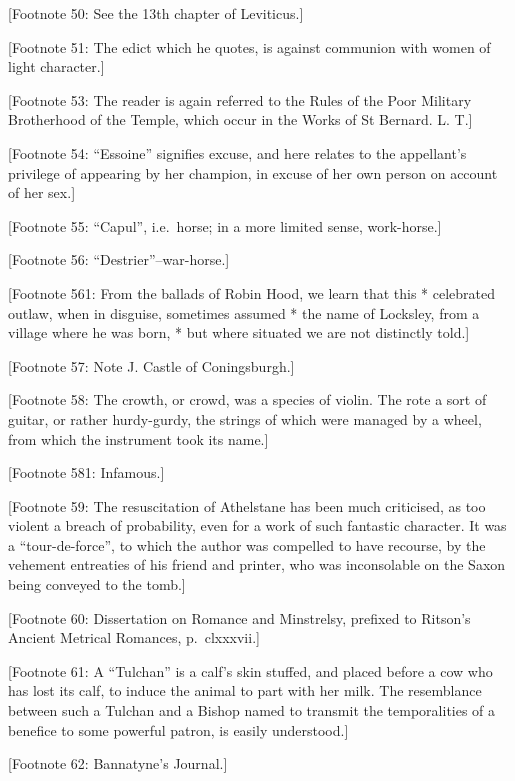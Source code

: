 {[}Footnote 50: See the 13th chapter of Leviticus.{]}

{[}Footnote 51: The edict which he quotes, is against communion with
women of light character.{]}

{[}Footnote 53: The reader is again referred to the Rules of the Poor
Military Brotherhood of the Temple, which occur in the Works of St
Bernard. L. T.{]}

{[}Footnote 54: ``Essoine'' signifies excuse, and here relates to the
appellant's privilege of appearing by her champion, in excuse of her own
person on account of her sex.{]}

{[}Footnote 55: ``Capul'', i.e.~horse; in a more limited sense,
work-horse.{]}

{[}Footnote 56: ``Destrier''--war-horse.{]}

{[}Footnote 561: From the ballads of Robin Hood, we learn that this *
celebrated outlaw, when in disguise, sometimes assumed * the name of
Locksley, from a village where he was born, * but where situated we are
not distinctly told.{]}

{[}Footnote 57: Note J. Castle of Coningsburgh.{]}

{[}Footnote 58: The crowth, or crowd, was a species of violin. The rote
a sort of guitar, or rather hurdy-gurdy, the strings of which were
managed by a wheel, from which the instrument took its name.{]}

{[}Footnote 581: Infamous.{]}

{[}Footnote 59: The resuscitation of Athelstane has been much
criticised, as too violent a breach of probability, even for a work of
such fantastic character. It was a ``tour-de-force'', to which the
author was compelled to have recourse, by the vehement entreaties of his
friend and printer, who was inconsolable on the Saxon being conveyed to
the tomb.{]}

{[}Footnote 60: Dissertation on Romance and Minstrelsy, prefixed to
Ritson's Ancient Metrical Romances, p.~clxxxvii.{]}

{[}Footnote 61: A ``Tulchan'' is a calf's skin stuffed, and placed
before a cow who has lost its calf, to induce the animal to part with
her milk. The resemblance between such a Tulchan and a Bishop named to
transmit the temporalities of a benefice to some powerful patron, is
easily understood.{]}

{[}Footnote 62: Bannatyne's Journal.{]}
